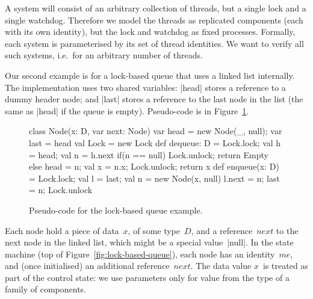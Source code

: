 A system will consist of an arbitrary collection of threads, but a single lock
and a single watchdog.  Therefore we model the threads as replicated
components (each with its own identity), but the lock and watchdog as fixed
processes.  Formally, each system is parameterised by its set of thread
identities.  We want to verify all such systems, i.e.~for an arbitrary number
of threads.


Our second example is for a lock-based queue that uses a linked list
internally.  The implementation uses two shared variables: |head| stores a
reference to a dummy header node; and |last| stores a reference to the last
node in the list (the same as |head| if the queue is empty).
Pseudo-code is in Figure~\ref{fig:lock-based-queue-pseudocode}.


\begin{figure}[htb]
\begin{scala}
class Node(x: D, var next: Node)
var head = new Node(_, null); var last = head
val Lock = new Lock
def dequeue: D = {
  Lock.lock; val h = head; val n = h.next
  if(n == null){ Lock.unlock; return Empty }
  else{ head = n; val x = n.x; Lock.unlock; return x }
}
def enqueue(x: D) = {
  Lock.lock; val l = last; val n = new Node(x, null) 
  l.next = n; last = n; Lock.unlock
}
\end{scala}
\caption{Pseudo-code for the lock-based queue example.}
\label{fig:lock-based-queue-pseudocode}
\end{figure}


Each node hold a piece of data~$x$, of some type~$D$, and a reference~$next$
to the next node in the linked list, which might be a special value~|null|.
In the state machine (top of Figure~\ref{fig:lock-based-queue}), each node has
an identity~$me$, and (once initialised) an additional reference~$next$.  The
data value $x$~is treated as part of the control state: we use parameters only
for value from the type of a family of components.




